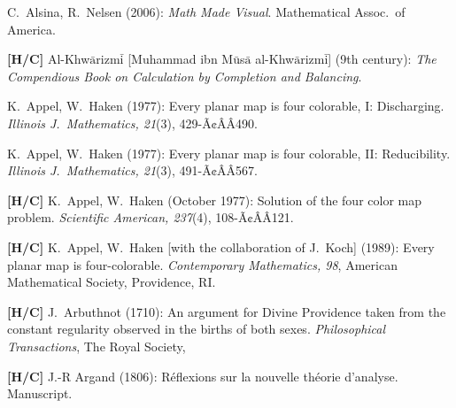 
\begin{thebibliography}{999}
 


C.~Alsina, R.~Nelsen (2006): {\it Math Made Visual}.
Mathematical Assoc.~of America.

{\bf [H/C]}
Al-Khw$\bar{\mbox{a}}$rizm$\bar{\mbox{i}}$ [Muhammad ibn M$\bar{\mbox{u}}$s$\bar{\mbox{a}}$ al-Khw$\bar{\mbox{a}}$rizm$\bar{\mbox{i}}$] (9th century):
{\it The Compendious Book on Calculation by Completion and Balancing}.



K.~Appel, W.~Haken (1977):
Every planar map is four colorable, I: Discharging.
{\it Illinois J.~Mathematics, 21}(3), 429-Ã¢ÂÂ490.

K.~Appel, W.~Haken (1977):
Every planar map is four colorable, II: Reducibility.
{\it Illinois J.~Mathematics, 21}(3), 491-Ã¢ÂÂ567.

{\bf [H/C]}
K.~Appel, W.~Haken (October 1977):
Solution of the four color map problem.
{\it Scientific American, 237}(4), 108-Ã¢ÂÂ121.

{\bf [H/C]}
K.~Appel, W.~Haken [with the collaboration of J.~Koch] (1989):
Every planar map is four-colorable.
{\it Contemporary Mathematics, 98},
American Mathematical Society, Providence, RI.

{\bf [H/C]}
J.~Arbuthnot (1710): 
An argument for Divine Providence taken from the constant regularity observed in the births of both sexes.
{\it Philosophical Transactions}, The Royal Society,

{\bf [H/C]}
J.-R Argand (1806):
R\'{e}flexions sur la nouvelle th\'{e}orie d'analyse.  Manuscript.



\end{thebibliography}
